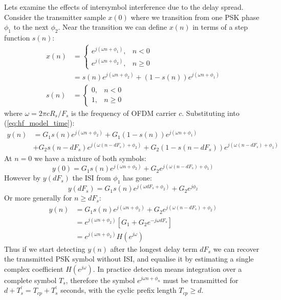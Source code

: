\documentclass{article}
\begin{document}
Lets examine the effects of intersymbol interference due to the delay spread.  Consider the transmitter sample $x(0)$ where we transition from one PSK phase $\phi_1$ to the next $\phi_2$.  Near the transition we can define $x(n)$ in terms of a step function $s(n)$:
\begin{equation}
\begin{split}
x(n) &=
	\begin{cases}
      e^{j (\omega n + \phi_1)}, & n < 0 \\
      e^{j (\omega n + \phi_2)}, & n \ge 0
	\end{cases} \\
	&= s(n)e^{j (\omega n + \phi_2)} + (1-s(n))e^{j (\omega n + \phi_1)}  \\
s(n) &=
	\begin{cases}
      0, & n < 0 \\
      1, & n \ge 0
	\end{cases}
\end{split}
\end{equation}
where $\omega=2 \pi c R_s/F_s$ is the frequency of OFDM carrier $c$.  Substituting into (\ref{eq:hf_model_time}): 
\begin{equation}
\begin{split}
y(n) &= G_1s(n)e^{j (\omega n + \phi_2)} + G_1(1-s(n))e^{j (\omega n + \phi_1)} \\
     &+ G_2s(n-dF_s)e^{j (\omega (n-dF_s) + \phi_2)} + G_2(1-s(n-dF_s))e^{j (\omega (n-dF_s) + \phi_1)}
\end{split}
\end{equation}
At $n=0$ we have a mixture of both symbols:
\begin{equation}
y(0) = G_1s(n)e^{j (\omega n + \phi_2)} + G_2e^{j (\omega (n-dF_s) + \phi_1)}
\end{equation}
However by $y(dF_s)$ the ISI from $\phi_1$ has gone:
\begin{equation}
y(dF_s) = G_1s(n)e^{j (\omega dF_s + \phi_2)} + G_2e^{j \phi_2}
\end{equation}
Or more generally for $n \ge dF_s$:
\begin{equation}
\begin{split}
y(n) &= G_1s(n)e^{j (\omega n + \phi_2)} + G_2e^{j (\omega (n-dF_s) + \phi_2)} \\
     &= e^{j (\omega n + \phi_2)} [ G_1 + G_2 e^{-j \omega dF_s } ] \\
     &= e^{j (\omega n + \phi_2)} H(e^{j \omega}) 
\end{split}
\end{equation}
Thus if we start detecting $y(n)$ after the longest delay term $dF_s$ we can recover the transmitted PSK symbol without ISI, and equalise it by estimating a single complex coefficient $H(e^{j \omega})$.  In practice detection means integration over a complete symbol $T_s$, therefore the symbol $e^{j \omega n + \phi_n}$ must be transmitted for $d+T^\prime_s=T_{cp}+T^\prime_s$ seconds, with the cyclic prefix length $T_{cp} \ge d$.
\end{document}
